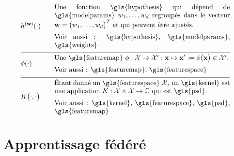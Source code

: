 \begin{align}
	& \hypothesis^{(\weights)}(\cdot) & \quad & \parbox{.75\textwidth}{
	Une fonction \gls{hypothesis} qui dépend de \gls{modelparams} $\weight_{1},\ldots,\weight_{\featuredim}$ regroupés dans le vecteur $\weights=\big(\weight_{1},\ldots,\weight_{\featuredim} \big)^{T}$ et qui peuvent être ajustés. \\
	[2mm] Voir aussi : \gls{hypothesis}, \gls{modelparams}, \gls{weights}
	} \nonumber \\[2mm] \hline \nonumber\\[-5mm]
	& \featuremap(\cdot) & \quad & \parbox{.75\textwidth}{
		Une \gls{featuremap} $\featuremap: \featurespace \rightarrow \featurespace' : \featurevec \mapsto \featurevec' \defeq \featuremap\big( \featurevec \big) \in \featurespace'$. \\
		[2mm] Voir aussi : \gls{featuremap}, \gls{featurespace}
	} \nonumber \\[2mm] \hline \nonumber\\[-5mm]
	& \kernelmap{\cdot}{\cdot} & \quad & \parbox{.75\textwidth}{
		Étant donné un \gls{featurespace} $\featurespace$, un \gls{kernel} est une application $\kernel: \featurespace \times \featurespace \rightarrow \mathbb{C}$ qui est \gls{psd}. \\
		[2mm] Voir aussi : \gls{kernel}, \gls{featurespace}, \gls{psd}, \gls{featuremap}
	} \nonumber
\end{align}
            

\newpage
\section*{Apprentissage fédéré}

